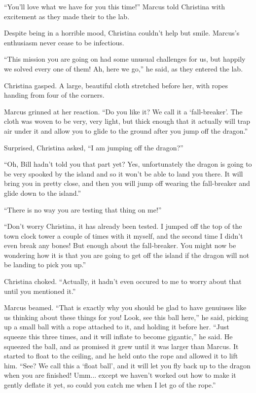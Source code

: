 \documentclass[showtrims,b6paper,draft,10pt]{memoir}
\begin{document}
\timeskip

``You'll love what we have for you this time!'' Marcus told Christina with excitement as they made their to the lab.

Despite being in a horrible mood, Christina couldn't help but smile.  Marcus's enthusiasm never cease to be infectious.

``This mission you are going on had some unusual challenges for us, but happily we solved every one of them!  Ah, here we go,'' he said, as they entered the lab.

Christina gasped.  A large, beautiful cloth stretched before her, with ropes handing from four of the corners.

Marcus grinned at her reaction.  ``Do you like it?  We call it a `fall-breaker'.  The cloth was woven to be very, very light, but thick enough that it actually will trap air under it and allow you to glide to the ground after you jump off the dragon.''

Surprised, Christina asked,  ``I am jumping off the dragon?''

``Oh, Bill hadn't told you that part yet?  Yes, unfortunately the dragon is going to be very spooked by the island and so it won't be able to land you there.  It will bring you in pretty close, and then you will jump off wearing the fall-breaker and glide down to the island.''

``There is no way you are testing that thing on me!''

``Don't worry Christina, it has already been tested.  I jumped off the top of the town clock tower a couple of times with it myself, and the second time I didn't even break any bones!  But enough about the fall-breaker.  You might now be wondering how it is that you are going to get off the island if the dragon will not be landing to pick you up.''

Christina choked.  ``Actually, it hadn't even occured to me to worry about that until you mentioned it.''

Marcus beamed.  ``That is exactly why you should be glad to have genuiuses like us thinking about these things for you!  Look, see this ball here,'' he said, picking up a small ball with a rope attached to it, and holding it before her.  ``Just squeeze this three times, and it will inflate to become gigantic,'' he said.  He squeezed the ball, and as promised it grew until it was larger than Marcus.  It started to float to the ceiling, and he held onto the rope and allowed it to lift him.  ``See?  We call this a `float ball', and it will let you fly back up to the dragon when you are finished!  Umm... except we haven't worked out how to make it gently deflate it yet, so could you catch me when I let go of the rope.''
\end{document}
